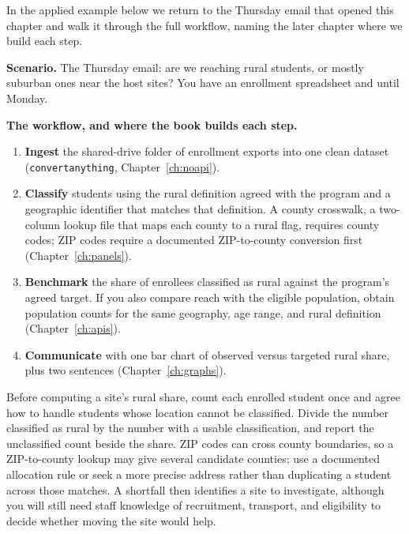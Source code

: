 \documentclass[
    a4paper,
    fontsize=10pt,
    twoside=true,
    numbers=noenddot,
]{kaobook}
\newcounter{appliedexample}
\newenvironment{appliedexample}[1][]{%
    \refstepcounter{appliedexample}%
    \begin{appliedexamplebox}[frametitle={Applied Example~\theappliedexample.~~#1}]%
}{%
    \end{appliedexamplebox}%
}
\begin{document}
In the applied example below we return to the Thursday email that opened this chapter and walk it through the full workflow, naming the later chapter where we build each step.

\begin{appliedexample}[From a funder's question to a one-page answer]\label{ae:ch01-funder}
\textbf{Scenario.} The Thursday email: are we reaching rural students, or mostly suburban ones near the host sites? You have an enrollment spreadsheet and until Monday.

\medskip
\textbf{The workflow, and where the book builds each step.}
\begin{enumerate}
    \item \textbf{Ingest} the shared-drive folder of enrollment exports into one clean dataset (\texttt{convertanything}, Chapter~\ref{ch:noapi}).
    \item \textbf{Classify} students using the rural definition agreed with the program and a geographic identifier that matches that definition. A county crosswalk, a two-column lookup file that maps each county to a rural flag, requires county codes; ZIP codes require a documented ZIP-to-county conversion first (Chapter~\ref{ch:panels}).
    \item \textbf{Benchmark} the share of enrollees classified as rural against the program's agreed target. If you also compare reach with the eligible population, obtain population counts for the same geography, age range, and rural definition (Chapter~\ref{ch:apis}).
    \item \textbf{Communicate} with one bar chart of observed versus targeted rural share, plus two sentences (Chapter~\ref{ch:graphs}).
\end{enumerate}
Before computing a site's rural share, count each enrolled student once and agree how to handle students whose location cannot be classified. Divide the number classified as rural by the number with a usable classification, and report the unclassified count beside the share. ZIP codes can cross county boundaries, so a ZIP-to-county lookup may give several candidate counties; use a documented allocation rule or seek a more precise address rather than duplicating a student across those matches. A shortfall then identifies a site to investigate, although you will still need staff knowledge of recruitment, transport, and eligibility to decide whether moving the site would help.
\end{appliedexample}
\end{document}
